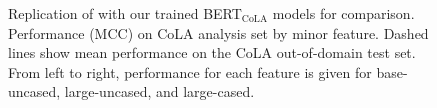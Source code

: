 \begin{figure}[h!]
    \caption[BERT$_\mathrm{CoLA}$ MCC scores on CoLA Analysis Set by minor feature]{Replication of \citet{warstadt2019linguistic} with our trained BERT$_\mathrm{CoLA}$ models for comparison.  Performance (MCC) on CoLA analysis set by minor feature.  Dashed lines show mean performance on the CoLA out-of-domain test set.  From left to right, performance for each feature is given for base-uncased, large-uncased, and large-cased.}
    \label{fig:bert_mcc_scores_cola_minor_features}
\end{figure}

